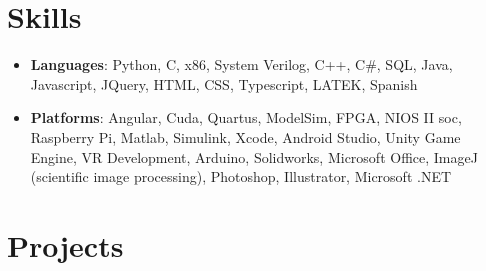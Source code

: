 \documentclass[letterpaper,10pt]{article}
\newcommand{\resumeSubHeadingListStart}{\begin{itemize}[leftmargin=*]}
\newcommand{\resumeSubHeadingListEnd}{\end{itemize}}
\begin{document}
  
     
\section{Skills}
  \resumeSubHeadingListStart
    \item[]{
    	\textbf{Languages}{: Python, C, x86, System Verilog, C++, C\#, SQL, Java, Javascript, JQuery, HTML, CSS, Typescript, LATEK, Spanish}
	}
    \item[]{
      \textbf{Platforms}{: Angular, Cuda, Quartus, ModelSim, FPGA, NIOS II soc, Raspberry Pi, Matlab, Simulink, Xcode, Android Studio, Unity Game Engine, VR Development, Arduino, Solidworks, Microsoft Office, ImageJ (scientific image processing), Photoshop, Illustrator, Microsoft .NET}
    	}
  \resumeSubHeadingListEnd
	
  

\section{Projects}
		
\end{document}
